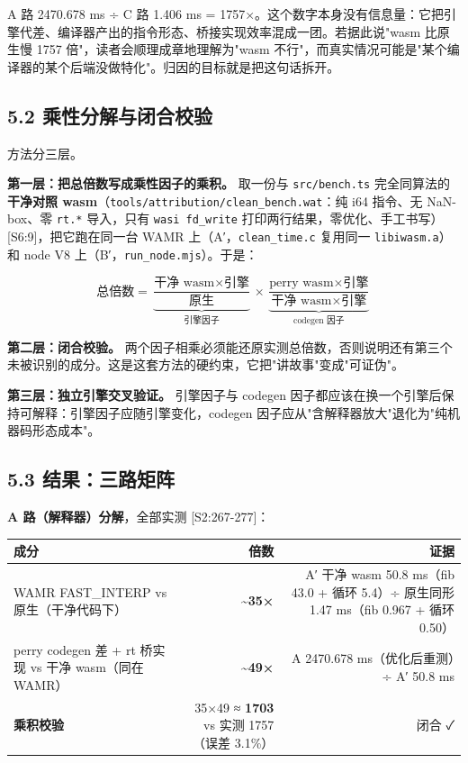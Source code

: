 \documentclass[11pt, a4paper]{article}
\begin{document}
A 路 2470.678 ms ÷ C 路 1.406 ms = 1757×。这个数字本身没有信息量：它把引擎代差、编译器产出的指令形态、桥接实现效率混成一团。若据此说"wasm 比原生慢 1757 倍"，读者会顺理成章地理解为"wasm 不行"，而真实情况可能是"某个编译器的某个后端没做特化"。归因的目标就是把这句话拆开。


\subsection{5.2 乘性分解与闭合校验}

方法分三层。


\textbf{第一层：把总倍数写成乘性因子的乘积。} 取一份与 \texttt{src/bench.ts} 完全同算法的\textbf{干净对照 wasm}（\texttt{tools/attribution/clean\_bench.wat}：纯 i64 指令、无 NaN-box、零 \texttt{rt.*} 导入，只有 \texttt{wasi fd\_write} 打印两行结果，零优化、手工书写）[S6:9]，把它跑在同一台 WAMR 上（A′，\texttt{clean\_time.c} 复用同一 \texttt{libiwasm.a}）和 node V8 上（B′，\texttt{run\_node.mjs}）。于是：


\[\text{总倍数} = \underbrace{\frac{\text{干净 wasm} \times \text{引擎}}{\text{原生}}}_{\text{引擎因子}} \times \underbrace{\frac{\text{perry wasm} \times \text{引擎}}{\text{干净 wasm} \times \text{引擎}}}_{\text{codegen 因子}}\]

\textbf{第二层：闭合校验。} 两个因子相乘必须能还原实测总倍数，否则说明还有第三个未被识别的成分。这是这套方法的硬约束，它把"讲故事"变成"可证伪"。


\textbf{第三层：独立引擎交叉验证。} 引擎因子与 codegen 因子都应该在换一个引擎后保持可解释：引擎因子应随引擎变化，codegen 因子应从"含解释器放大"退化为"纯机器码形态成本"。


\subsection{5.3 结果：三路矩阵}

\textbf{A 路（解释器）分解}，全部实测 [S2:267-277]：


\begin{center}\small\begin{tabular}{lrr}
\toprule
成分 & 倍数 & 证据 \\
\midrule
WAMR FAST\_INTERP vs 原生（干净代码下） & \textbf{\textasciitilde{}35×} & A′ 干净 wasm 50.8 ms（fib 43.0 + 循环 5.4）÷ 原生同形 1.47 ms（fib 0.967 + 循环 0.50） \\
perry codegen 差 + rt 桥实现 vs 干净 wasm（同在 WAMR） & \textbf{\textasciitilde{}49×} & A 2470.678 ms（优化后重测）÷ A′ 50.8 ms \\
\textbf{乘积校验} & 35×49 ≈ \textbf{1703} vs 实测 1757（误差 3.1\%） & 闭合 ✓ \\
\bottomrule
\end{tabular}\end{center}
\end{document}
